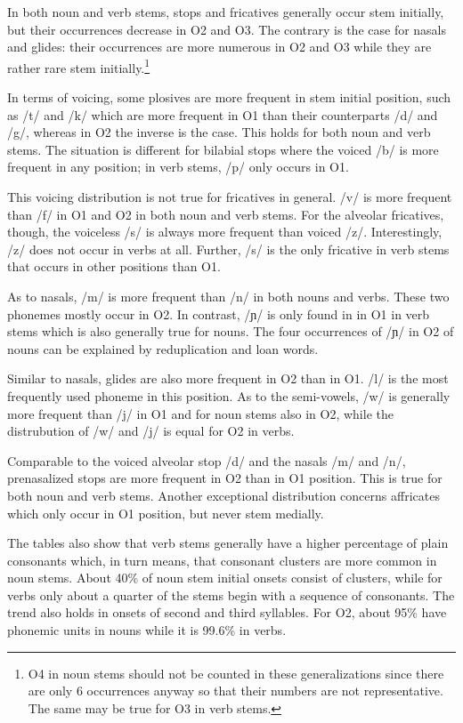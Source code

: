In both noun and verb stems, stops and fricatives generally occur stem initially, but their occurrences decrease in O2 and O3. The contrary is the case for nasals and glides: their occurrences are more numerous in O2 and O3 while they are rather rare stem initially.\footnote{O4 in noun stems should not be counted in these generalizations since there are only 6 occurrences anyway so that their numbers are not representative. The same may be true for O3 in verb stems.} 

In terms of voicing, some plosives are more frequent in stem initial position, such as /t/ and /k/ which are more frequent in O1 than their counterparts /d/ and /g/, whereas in O2 the inverse is the case. This holds for both noun and verb stems. The situation is different for bilabial stops where the voiced /b/ is more frequent in any position; in verb stems, /p/ only occurs in O1.

This voicing distribution is not true for fricatives in general. /v/ is more frequent than /f/ in O1 and O2 in both noun and verb stems. For the alveolar fricatives, though, the voiceless /s/ is always more frequent than voiced /z/. Interestingly, /z/ does not occur in verbs at all. Further, /s/ is the only fricative in verb stems that occurs in other positions than O1.

As to nasals, /m/ is more frequent than /n/ in both nouns and verbs. These two phonemes mostly occur in O2. In contrast, /ɲ/ is only found in in O1 in verb stems which is also generally true for nouns. The four occurrences  of /ɲ/ in O2 of nouns can be explained by reduplication and loan words.

Similar to nasals, glides are also more frequent in O2 than in O1. /l/ is the most frequently used phoneme in this position. As to the semi-vowels, /w/ is generally more frequent than /j/ in O1 and for noun stems also in O2, while the distrubution of /w/ and /j/ is equal for O2 in verbs.

Comparable to the voiced alveolar stop /d/ and the nasals /m/ and /n/, prenasalized stops are more frequent in O2 than in O1 position. This is true for both noun and verb stems. Another exceptional distribution concerns affricates which only occur in O1 position, but never stem medially. 

The tables also show that verb stems generally have a higher percentage of plain consonants which, in turn means, that consonant clusters are more common in noun stems. About 40\% of noun stem initial onsets consist of clusters, while for verbs only about a quarter of the stems begin with a sequence of consonants. The trend also holds in onsets of second and third syllables. For O2, about 95\% have phonemic units in nouns while it is 99.6\% in verbs.

